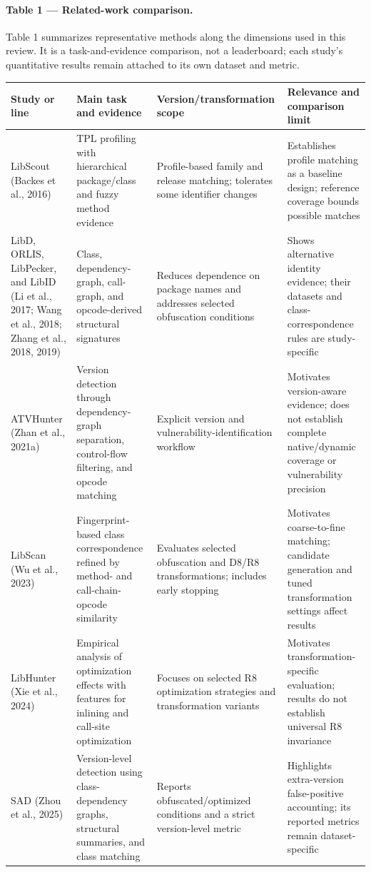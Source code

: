 \documentclass[10pt,twocolumn]{article}
\begin{document}
\paragraph{Table 1 — Related-work comparison.}
Table 1 summarizes representative methods along the dimensions used in this review. It is a task-and-evidence comparison, not a leaderboard; each study's quantitative results remain attached to its own dataset and metric.
\begin{center}\small\begin{tabularx}{\columnwidth}{@{}X@{}X@{}X@{}X@{}}
\textbf{Study or line} & \textbf{Main task and evidence} & \textbf{Version/transformation scope} & \textbf{Relevance and comparison limit} \\
\midrule
LibScout (Backes et al., 2016) & TPL profiling with hierarchical package/class and fuzzy method evidence & Profile-based family and release matching; tolerates some identifier changes & Establishes profile matching as a baseline design; reference coverage bounds possible matches \\
LibD, ORLIS, LibPecker, and LibID (Li et al., 2017; Wang et al., 2018; Zhang et al., 2018, 2019) & Class, dependency-graph, call-graph, and opcode-derived structural signatures & Reduces dependence on package names and addresses selected obfuscation conditions & Shows alternative identity evidence; their datasets and class-correspondence rules are study-specific \\
ATVHunter (Zhan et al., 2021a) & Version detection through dependency-graph separation, control-flow filtering, and opcode matching & Explicit version and vulnerability-identification workflow & Motivates version-aware evidence; does not establish complete native/dynamic coverage or vulnerability precision \\
LibScan (Wu et al., 2023) & Fingerprint-based class correspondence refined by method- and call-chain-opcode similarity & Evaluates selected obfuscation and D8/R8 transformations; includes early stopping & Motivates coarse-to-fine matching; candidate generation and tuned transformation settings affect results \\
LibHunter (Xie et al., 2024) & Empirical analysis of optimization effects with features for inlining and call-site optimization & Focuses on selected R8 optimization strategies and transformation variants & Motivates transformation-specific evaluation; results do not establish universal R8 invariance \\
SAD (Zhou et al., 2025) & Version-level detection using class-dependency graphs, structural summaries, and class matching & Reports obfuscated/optimized conditions and a strict version-level metric & Highlights extra-version false-positive accounting; its reported metrics remain dataset-specific \\

\end{tabularx}
\end{center}
\end{document}
